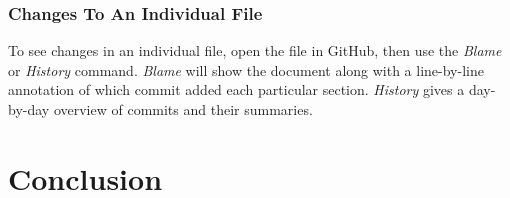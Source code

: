 \documentclass[11pt]{article}
\begin{document}
\subsubsection{Changes To An Individual File}

To see changes in an individual file, open the file in GitHub, then use the \textit{Blame} or \textit{History} command. \textit{Blame} will show the document along with a line-by-line annotation of which commit added each particular section. \textit{History} gives a day-by-day overview of commits and their summaries. 

\section{Conclusion}



\end{document}
